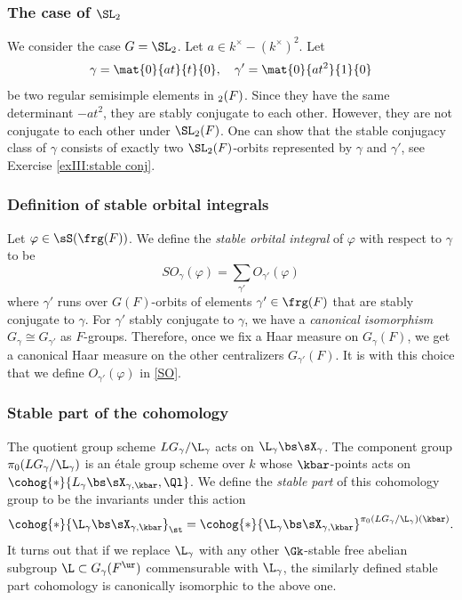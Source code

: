 \subsubsection{The case of $\SL_{2}$}\label{sss:st conj SL2} We consider the case $G=\SL_{2}$. Let  $a\in k^{\times}-(k^{\times})^{2}$. Let
\begin{equation*}
\gamma=\mat{0}{at}{t}{0}, \quad \gamma'=\mat{0}{at^{2}}{1}{0}
\end{equation*}
be two regular semisimple elements in $\sl_{2}(F)$. Since they have the same determinant $-at^{2}$, they are stably conjugate to each other. However, they are not conjugate to each other under $\SL_{2}(F)$. One can show that the stable conjugacy class of $\gamma$ consists of exactly two $\SL_{2}(F)$-orbits represented by $\gamma$ and $\gamma'$, see Exercise \ref{exIII:stable conj}.


\subsubsection{Definition of stable orbital integrals} Let $\varphi\in\sS(\frg(F))$. We define the {\em stable orbital integral} of $\varphi$ with respect to $\gamma$ to be
\begin{equation}\label{SO}
SO_{\gamma}(\varphi)=\sum_{\gamma'}O_{\gamma'}(\varphi)
\end{equation}
where $\gamma'$ runs over $G(F)$-orbits of elements $\gamma'\in \frg(F)$ that are stably conjugate to $\gamma$. For $\gamma'$ stably conjugate to $\gamma$, we have a {\em canonical isomorphism} $G_{\gamma}\cong G_{\gamma'}$ as $F$-groups. Therefore, once we fix a Haar measure on $G_{\gamma}(F)$, we get a canonical Haar measure on the other centralizers $G_{\gamma'}(F)$. It is with this choice that we define $O_{\gamma'}(\varphi)$ in  \eqref{SO}.

\subsubsection{Stable part of the cohomology}\label{sss:st H} The quotient group scheme $LG_{\gamma}/\L_{\gamma}$ acts on $\L_{\gamma}\bs\sX_{\gamma}$.  The component group $\pi_{0}(LG_{\gamma}/\L_{\gamma})$ is an \'etale group scheme over $k$ whose $\kbar$-points acts on $\cohog{*}{L_{\gamma}\bs\sX_{\gamma,\kbar},\Ql}$. We define the {\em stable part} of this cohomology group to be the invariants under this action
\begin{equation*}
\cohog{*}{\L_{\gamma}\bs\sX_{\gamma,\kbar}}_{\st}=\cohog{*}{\L_{\gamma}\bs\sX_{\gamma,\kbar}}^{\pi_{0}(LG_{\gamma}/\L_{\gamma})(\kbar)}.
\end{equation*}
It turns out that if we replace $\L_{\gamma}$ with any other $\Gk$-stable free abelian subgroup $\L\subset G_{\gamma}(F^{\ur})$ commensurable with $\L_{\gamma}$, the similarly defined stable part cohomology is canonically isomorphic to the above one.



